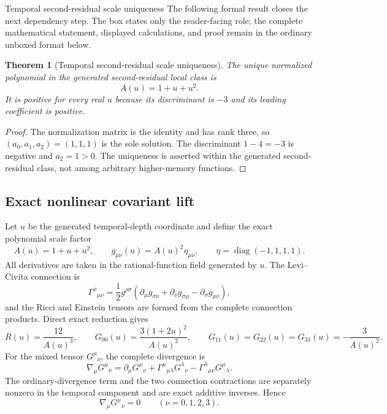 \documentclass[11pt]{article}
\numberwithin{equation}{section}
\newtheorem{theorem}[definition]{Theorem}
\theoremstyle{remark}
\newcommand{\diag}{\operatorname{diag}}
\begin{document}
\begin{proofguide}{Temporal second-residual scale uniqueness}
The following formal result closes the next dependency step. The box states only the reader-facing role; the complete mathematical statement, displayed calculations, and proof remain in the ordinary unboxed format below.
\end{proofguide}
\begin{theorem}[Temporal second-residual scale uniqueness]
The unique normalized polynomial in the generated second-residual local class is
\begin{equation}
A(u)=1+u+u^2.
\label{eq:scale-unique}
\end{equation}
It is positive for every real $u$ because its discriminant is $-3$ and its leading coefficient is positive.
\end{theorem}
\begin{proof}
The normalization matrix is the identity and has rank three, so $(a_0,a_1,a_2)=(1,1,1)$ is the sole solution. The discriminant $1-4=-3$ is negative and $a_2=1>0$. The uniqueness is asserted within the generated second-residual class, not among arbitrary higher-memory functions.
\end{proof}

\subsection{Exact nonlinear covariant lift}
Let $u$ be the generated temporal-depth coordinate and define the exact polynomial scale factor
\begin{equation}
A(u)=1+u+u^2,
\qquad
g_{\mu\nu}(u)=A(u)^2\eta_{\mu\nu},
\qquad
\eta=\diag(-1,1,1,1).
\label{eq:nonlinearmetric}
\end{equation}
All derivatives are taken in the rational-function field generated by $u$. The Levi--Civita connection is
\begin{equation}
\Gamma^{\rho}{}_{\mu\nu}
=\frac12g^{\rho\sigma}
\left(\partial_\mu g_{\sigma\nu}+\partial_\nu g_{\sigma\mu}-\partial_\sigma g_{\mu\nu}\right),
\end{equation}
and the Ricci and Einstein tensors are formed from the complete connection products. Direct exact reduction gives
\begin{equation}
R(u)=\frac{12}{A(u)^3},
\qquad
G_{00}(u)=\frac{3(1+2u)^2}{A(u)^2},
\qquad
G_{11}(u)=G_{22}(u)=G_{33}(u)=-\frac{3}{A(u)^2}.
\label{eq:nonlineareinstein}
\end{equation}
For the mixed tensor $G^{\mu}{}_{\nu}$, the complete divergence is
\begin{equation}
\nabla_\mu G^{\mu}{}_{\nu}
=\partial_\mu G^{\mu}{}_{\nu}
+\Gamma^{\mu}{}_{\mu\lambda}G^{\lambda}{}_{\nu}
-\Gamma^{\lambda}{}_{\mu\nu}G^{\mu}{}_{\lambda}.
\label{eq:covariantbianchi}
\end{equation}
The ordinary-divergence term and the two connection contractions are separately nonzero in the temporal component and are exact additive inverses. Hence
\begin{equation}
\nabla_\mu G^{\mu}{}_{\nu}=0
\qquad(\nu=0,1,2,3).
\label{eq:exactbianchi}
\end{equation}
\end{document}
